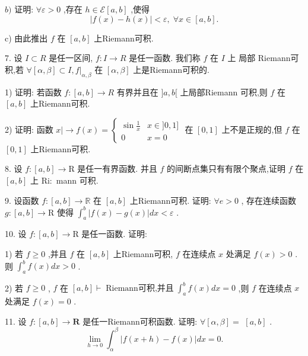 $b)$ 证明: $\forall \varepsilon  > 0$ ,存在 $h \in  \mathcal{E}\left\lbrack  {a,b}\right\rbrack$ ,使得
$$\left| {f\left( x\right)  - h\left( x\right) }\right|  < \varepsilon ,\;\forall x \in  \left\lbrack  {a,b}\right\rbrack  .$$

c) 由此推出 $f$ 在 $\left\lbrack  {a,b}\right\rbrack$ 上Riemann可积.

7. 设 $I \subset  R$ 是任一区间, $f : I \rightarrow  R$ 是任一函数. 我们称 $f$ 在 $I$ 上 局部 Riemann可积,若 $\forall \left\lbrack  {\alpha ,\beta }\right\rbrack   \subset  I,{\left. f\right| }_{\alpha ,\beta }$ 在 $\left\lbrack  {\alpha ,\beta }\right\rbrack$ 上是Riemann可积的.

1) 证明: 若函数 $f : \left\lbrack  {a,b}\right\rbrack   \rightarrow  R$ 有界并且在 $\rbrack a,b\lbrack$ 上局部Riemann 可积,则 $f$ 在 $\left\lbrack  {a,b}\right\rbrack$ 上Riemann可积.

2) 证明: 函数 $x \mid   \rightarrow  f\left( x\right)  = \left\{  \begin{matrix} \sin \frac{1}{x} & x \in  \rbrack 0,1\rbrack \\  0 & x = 0 \end{matrix}\right.$ 在 $\left\lbrack  {0,1}\right\rbrack$ 上不是正规的,但 $f$ 在 $\left\lbrack  {0,1}\right\rbrack$ 上Riemann可积.

8. 设 $f : \left\lbrack  {a,b}\right\rbrack   \rightarrow  \mathrm{R}$ 是任一有界函数. 并且 $f$ 的间断点集只有有限个聚点,证明 $f$ 在 $\left\lbrack  {a,b}\right\rbrack$ 上 $\mathrm{{Ri}} :$ mann 可积.

9. 设函数 $f : \left\lbrack  {a,b}\right\rbrack   \rightarrow  \mathbb{R}$ 在 $\left\lbrack  {a,b}\right\rbrack$ 上Riemann可积. 证明: $\forall e > 0$ , 存在连续函数 $g : \left\lbrack  {a,b}\right\rbrack   \rightarrow  \mathrm{R}$ 使得 ${\int }_{a}^{b}\left| {f\left( x\right)  - g\left( x\right) }\right| {dx} < \varepsilon$ .

10. 设 $f : \left\lbrack  {a,b}\right\rbrack   \rightarrow  \mathrm{R}$ 是任一函数. 证明:

1) 若 $f \geq  0$ ,并且 $f$ 在 $\left\lbrack  {a,b}\right\rbrack$ 上Riemann可积, $f$ 在连续点 $x$ 处满足 $f\left( x\right)  > 0$ . 则 ${\int }_{a}^{b}f\left( x\right) {dx} > 0$ .

2) 若 $f \geq  0$ , $f$ 在 $\left\lbrack  {a,b}\right\rbrack   \vdash  \operatorname{Riemann可积,并且}{\int }_{a}^{b}f\left( x\right) {dx} = 0$ ,则 $f$ 在连续点 $x$ 处满足 $f\left( x\right)  = 0$ .

11. 设 $f : \left\lbrack  {a,b}\right\rbrack   \rightarrow  \mathbf{R}$ 是任一Riemann可积函数. 证明: $\forall \left\lbrack  {\alpha ,\beta }\right\rbrack   =$  $\left\lbrack  {a,b}\right\rbrack$ .
$$\mathop{\lim }\limits_{{h \rightarrow  0}}{\int }_{\alpha }^{\beta }\left| {f\left( {x + h}\right)  - f\left( x\right) }\right| {dx} = 0.$$

